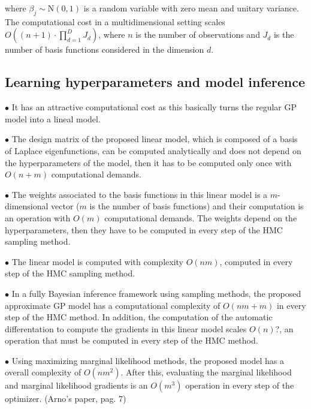 \documentclass[]{interact}
\theoremstyle{plain}%
\theoremstyle{definition}
\theoremstyle{remark}
\begin{document}
\noindent where $\beta_j \sim \text{N}(0,1)$ is a random variable with zero mean and unitary variance. The computational cost in a multidimensional setting scales $O((n+1)\cdot \prod_{d=1}^D J_d )$, where $n$ is the number of observations and $J_d$ is the number of basis functions considered in the dimension $d$.

\subsection{Learning hyperparameters and model inference}

\vspace{2mm}
$\bullet$ It has an attractive computational cost as this basically turns the regular GP model into a lineal model.

\vspace{2mm}
$\bullet$ The design matrix of the proposed linear model, which is composed of a basis of Laplace eigenfunctions, can be computed analytically and does not depend on the hyperparameters of the model, then it has to be computed only once with $O(n+m)$ computational demands.

\vspace{2mm}
$\bullet$ The weights associated to the basis functions in this linear model is a $m$-dimensional vector ($m$ is the number of basis functions) and their computation is an operation with $O(m)$ computational demands. The weights depend on the hyperparameters, then they have to be computed in every step of the HMC sampling method.

\vspace{2mm}
$\bullet$ The linear model is computed with complexity $O(nm)$, computed in every step of the HMC sampling method.

\vspace{2mm}
$\bullet$ In a fully Bayesian inference framework using sampling methods, the proposed approximate GP model has a computational complexity of $O(nm+m)$ in every step of the HMC method. In addition, the computation of the automatic differentation to compute the gradients in this linear model scales $O(n)$?, an operation that must be computed in every step of the HMC method.

\vspace{2mm}
$\bullet$ Using maximizing marginal likelihood methods, the proposed model has a overall complexity of $O(nm^2)$. After this, evaluating the marginal likelihood and marginal likelihood gradients is an $O(m^3)$ operation in every step of the optimizer. (Arno's paper, pag. 7)
\end{document}
